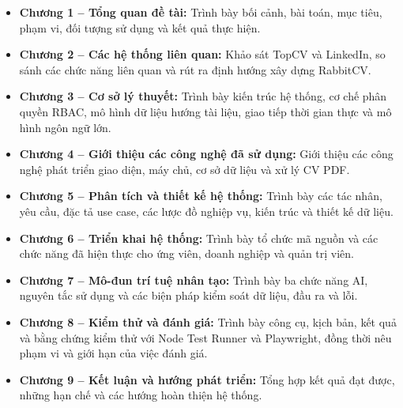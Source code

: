 \begin{itemize}
    \item \textbf{Chương 1 -- Tổng quan đề tài:} Trình bày bối cảnh, bài toán, mục tiêu, phạm vi, đối tượng sử dụng và kết quả thực hiện.
    \item \textbf{Chương 2 -- Các hệ thống liên quan:} Khảo sát TopCV và LinkedIn, so sánh các chức năng liên quan và rút ra định hướng xây dựng RabbitCV.
    \item \textbf{Chương 3 -- Cơ sở lý thuyết:} Trình bày kiến trúc hệ thống, cơ chế phân quyền RBAC, mô hình dữ liệu hướng tài liệu, giao tiếp thời gian thực và mô hình ngôn ngữ lớn.
    \item \textbf{Chương 4 -- Giới thiệu các công nghệ đã sử dụng:} Giới thiệu các công nghệ phát triển giao diện, máy chủ, cơ sở dữ liệu và xử lý CV PDF.
    \item \textbf{Chương 5 -- Phân tích và thiết kế hệ thống:} Trình bày các tác nhân, yêu cầu, đặc tả use case, các lược đồ nghiệp vụ, kiến trúc và thiết kế dữ liệu.
    \item \textbf{Chương 6 -- Triển khai hệ thống:} Trình bày tổ chức mã nguồn và các chức năng đã hiện thực cho ứng viên, doanh nghiệp và quản trị viên.
    \item \textbf{Chương 7 -- Mô-đun trí tuệ nhân tạo:} Trình bày ba chức năng AI, nguyên tắc sử dụng và các biện pháp kiểm soát dữ liệu, đầu ra và lỗi.
    \item \textbf{Chương 8 -- Kiểm thử và đánh giá:} Trình bày công cụ, kịch bản, kết quả và bằng chứng kiểm thử với Node Test Runner và Playwright, đồng thời nêu phạm vi và giới hạn của việc đánh giá.
    \item \textbf{Chương 9 -- Kết luận và hướng phát triển:} Tổng hợp kết quả đạt được, những hạn chế và các hướng hoàn thiện hệ thống.
\end{itemize}
